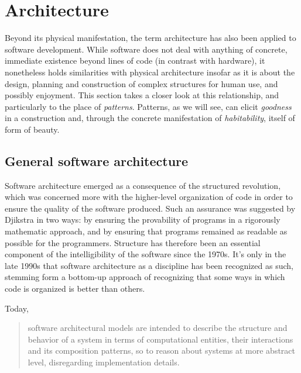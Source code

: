 \documentclass{article}
\begin{document}
\pagebreak

\section{Architecture}

Beyond its physical manifestation, the term architecture has also been applied to software development. While software does not deal with anything of concrete, immediate existence beyond lines of code (in contrast with hardware), it nonetheless holds similarities with physical architecture insofar as it is about the design, planning and construction of complex structures for human use, and possibly enjoyment. This section takes a closer look at this relationship, and particularly to the place of \emph{patterns}. Patterns, as we will see, can elicit \emph{goodness} in a construction and, through the concrete manifestation of \emph{habitability}, itself of form of beauty.

\subsection{General software architecture}

Software architecture emerged as a consequence of the structured revolution\cite{dijkstra_chapter_1972}, which was concerned more with the higher-level organization of code in order to ensure the quality of the software produced. Such an assurance was suggested by Djikstra in two ways: by ensuring the provability of programs in a rigorously mathematic approach, and by ensuring that programs remained as readable as possible for the programmers. Structure has therefore been an essential component of the intelligibility of the software since the 1970s. It's only in the late 1990s that software architecture as a discipline has been recognized as such, stemming form a bottom-up approach of recognizing that some ways in which code is organized is better than others.

Today, 
\begin{quote}
  software architectural models are intended to describe the structure and behavior of a system in terms of computational entities, their interactions and its composition patterns, so to reason about systems at more abstract  level, disregarding implementation details.\cite{garland_software_2000}
\end{quote}
\end{document}
